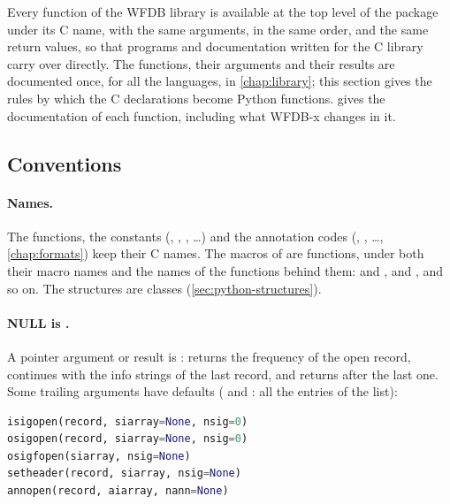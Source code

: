 Every function of the WFDB library is available at the top level of the package under its
C name, with the same arguments, in the same order, and the same return values, so that
programs and documentation written for the C library carry over directly. The functions,
their arguments and their results are documented once, for all the languages, in
\cref{chap:library}; this section gives the rules by which the C declarations become
Python functions.  gives the documentation of each function,
including what WFDB-x changes in it.

\subsection{Conventions}

\paragraph{Names.} The functions, the constants (,
, , \ldots) and the annotation codes
(, , \ldots, \cref{chap:formats}) keep their C names. The macros of
 are functions, under both their macro names and the names of the
functions behind them:  and ,  and
, and so on. The structures are classes
(\cref{sec:python-structures}).

\paragraph{NULL is .} A  pointer argument or result is
:  returns the frequency of the open record,
 continues with the info strings of the last record, and
 returns  after the last one. Some trailing arguments have
defaults ( and : all the entries of the list):
\begin{lstlisting}[language=Python]
isigopen(record, siarray=None, nsig=0)
osigopen(record, siarray=None, nsig=0)
osigfopen(siarray, nsig=None)
setheader(record, siarray, nsig=None)
annopen(record, aiarray, nann=None)
\end{lstlisting}

